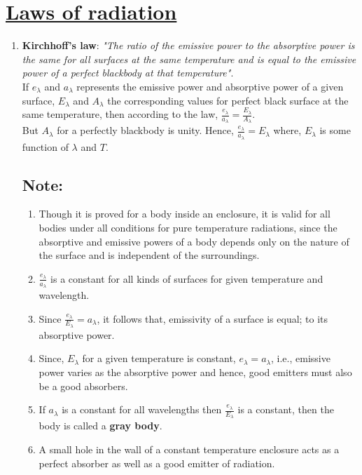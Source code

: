 \documentclass[16pt,a4paper]{article}
\begin{document}
\section{\underline{Laws of radiation}}
\begin{enumerate}
	\item \textbf{Kirchhoff's law}: \textit{"The ratio of the emissive power to the absorptive power is the same for all surfaces at the same temperature and is equal to the emissive power of a perfect blackbody at that temperature"}.\\
	If $e_{\lambda}$ and $a_{\lambda}$ represents the emissive power and absorptive power of a given surface, $E_{\lambda}$ and $A_{\lambda}$ the corresponding values for perfect black surface at the same temperature,
	then according to the law,
	$\frac{e_{\lambda}}{a_{\lambda}} = \frac{E_{\lambda}}{A_{\lambda}}$.
	\\
	But $A_{\lambda}$ for a perfectly blackbody is unity. Hence, $\frac{e_{\lambda}}{a_{\lambda}} = E_{\lambda} $ where, $E_{\lambda}$ is some function of $\lambda$ and $T$.

\subsection{\textbf{Note}:}
\begin{enumerate}
	\item Though it is proved for a body inside an enclosure, it is valid for all bodies under all conditions for pure temperature radiations, since the absorptive and emissive powers of a body depends only on the nature of the surface and is independent of the surroundings.
	\item $\frac{e_{\lambda}}{a_{\lambda}}$ is a constant for all kinds of surfaces for given temperature and wavelength.
	\item Since $\frac{e_{\lambda}}{E_{\lambda}} = a_{\lambda}$, it follows that, emissivity of a surface is equal; to its absorptive power.
	\item Since, $E_{\lambda}$ for a given temperature is constant, $e_{\lambda}=a_{\lambda}$, i.e., emissive power varies as the absorptive power and hence, good emitters must also be a good absorbers.
	\item If $a_{\lambda}$ is a constant for all wavelengths then  $\frac{e_{\lambda}}{E_{\lambda}}$ is a constant, then the body is called a \textbf{gray body}.
	\item A small hole in the wall of a constant temperature enclosure acts as a perfect absorber as well as a good emitter of radiation.
\end{enumerate}


\end{enumerate}
\end{document}
